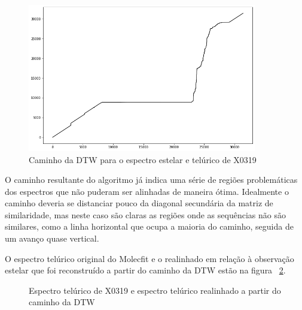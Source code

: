 \begin{figure}[htb]
\centering
\includegraphics[width=10cm]{figuras/x0319_warp_path.png}
\caption{Caminho da DTW para o espectro estelar e telúrico de X0319}
\label{fig:x0319-warp-path}
\end{figure}

O caminho resultante do algoritmo já indica uma série de regiões problemáticas dos espectros que não puderam ser alinhadas de maneira ótima. Idealmente o caminho deveria se distanciar pouco da diagonal secundária da matriz de similaridade, mas neste caso são claras as regiões onde as sequências não são similares, como a linha horizontal que ocupa a maioria do caminho, seguida de um avanço quase vertical.

O espectro telúrico original do Molecfit e o realinhado em relação à observação estelar que foi reconstruído a partir do caminho da DTW estão na figura~ \ref{fig:x0319-realigned-telluric}.

\begin{figure}[htb]
  \centering
  \hfill
  \caption{Espectro telúrico de X0319 e espectro telúrico realinhado a partir do caminho da DTW}
  \label{fig:x0319-realigned-telluric}
\end{figure}

